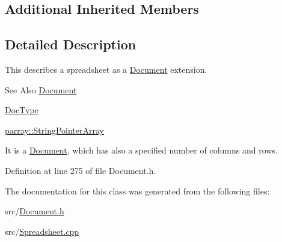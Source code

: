\subsection*{Additional Inherited Members}


\subsection{Detailed Description}
This describes a spreadsheet as a \hyperlink{classdocs_1_1Document}{Document} extension. 

\begin{DoxySeeAlso}{See Also}
\hyperlink{classdocs_1_1Document}{Document} 

\hyperlink{classdocs_1_1DocType}{Doc\-Type} 

\hyperlink{classparray_1_1StringPointerArray}{parray\-::\-String\-Pointer\-Array}
\end{DoxySeeAlso}
It is a \hyperlink{classdocs_1_1Document}{Document}, which has also a specified number of columns and rows. 

Definition at line 275 of file Document.\-h.



The documentation for this class was generated from the following files\-:\begin{DoxyCompactItemize}
\item 
src/\hyperlink{Document_8h}{Document.\-h}\item 
src/\hyperlink{Spreadsheet_8cpp}{Spreadsheet.\-cpp}\end{DoxyCompactItemize}
